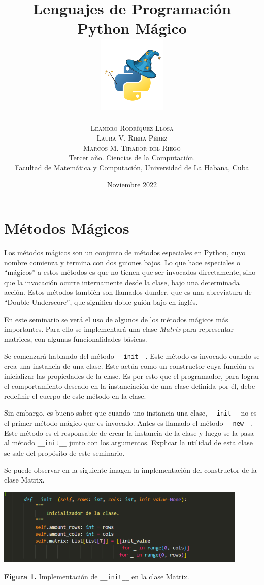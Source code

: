 \documentclass[10pt]{article} %
\title{\normalsize{Lenguajes de Programaci\'on}\\
\Huge\bfseries Python M\'agico\\
\includegraphics[height=5em]{magic_logo.png}} %
\author{%
\normalsize\textsc{Leandro Rodr\'iquez Llosa}\\
\normalsize\textsc{Laura V. Riera P\'erez}\\ 
\normalsize\textsc{Marcos M. Tirador del Riego} \\[2ex]
\small Tercer a\~no. Ciencias de la Computaci\'on. \\ %
\small Facultad de Matem\'atica y Computaci\'on, Universidad de La Habana, Cuba \\ %
}
\date{\footnotesize Noviembre 2022 } %
\newcommand{\imgcaption}[2]{\tiny \textbf{Figura #1.} #2.}
\newcommand{\mgc}[2][]{\colorbox{backcolour}{\texttt{\_\_#2\_\_#1}}}
\newcommand{\mgccapt}[1]{\texttt{\_\_#1\_\_}}
\begin{document}
\maketitle


\vspace{1em}
\section{M\'etodos M\'agicos}

Los m\'etodos m\'agicos son un conjunto de m\'etodos especiales en Python, cuyo nombre comienza y termina con dos guiones bajos. Lo que hace especiales o ``m\'agicos'' a estos m\'etodos es que no tienen que ser invocados directamente, sino que la invocaci\'on ocurre internamente desde la clase, bajo una determinada acci\'on. Estos m\'etodos tambi\'en son llamados dunder, que es una abreviatura de ``Double Underscore'', que significa doble gui\'on bajo en ingl\'es. 

En este seminario se ver\'a el uso de algunos de los m\'etodos m\'agicos m\'as importantes. Para ello se implementar\'a una clase \emph{Matrix} para representar matrices, con algunas funcionalidades b\'asicas.

Se comenzar\'a hablando del m\'etodo \mgc{init}. Este m\'etodo es invocado cuando se crea una instancia de una clase. Este act\'ua como un constructor cuya funci\'on es inicializar las propiedades de la clase. Es por esto que el programador, para lograr el comportamiento deseado en la instanciaci\'on de una clase definida por \'el, debe redefinir el cuerpo de este m\'etodo en la clase.

Sin embargo, es bueno saber que cuando uno instancia una clase, \mgc{init} no es el primer m\'etodo m\'agico que es invocado. Antes es llamado el m\'etodo  \mgc{new}. Este m\'etodo es el responsable de crear la instancia de la clase y luego se la pasa al m\'etodo \mgc{init} junto con los argumentos. Explicar la utilidad de esta clase se sale del prop\'osito de este seminario.

Se puede observar en la siguiente imagen la implementación del constructor de la clase Matrix.

\begin{center}
	\includegraphics[width=12cm]{init.png}
	
	\imgcaption{1}{Implementaci\'on de \mgccapt{init} en la clase Matrix}
\end{center}
\end{document}
